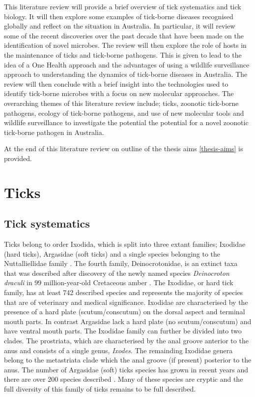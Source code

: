 \documentclass[a4paper, nobind]{templates/ociamthesis}
\begin{document}
This literature review will provide a brief overview of tick systematics and tick biology.
It will then explore some examples of tick-borne diseases recognised globally and reflect on the situation in Australia.
In particular, it will review some of the recent discoveries over the past decade that have been made on the identification of novel microbes.
The review will then explore the role of hosts in the maintenance of ticks and tick-borne pathogens.
This is given to lead to the idea of a One Health approach and the advantages of using a wildlife surveillance approach to understanding the dynamics of tick-borne diseases in Australia.
The review will then conclude with a brief insight into the technologies used to identify tick-borne microbes with a focus on new molecular approaches.
The overarching themes of this literature review include; ticks, zoonotic tick-borne pathogens, ecology of tick-borne pathogens, and use of new molecular tools and wildlife surveillance to investigate the potential the potential for a novel zoonotic tick-borne pathogen in Australia.

At the end of this literature review on outline of the thesis aims \ref{thesis-aims} is provided.

\hypertarget{ticks}{%
\section{Ticks}\label{ticks}}

\hypertarget{tick-systematics}{%
\subsection{Tick systematics}\label{tick-systematics}}

Ticks belong to order Ixodida, which is split into three extant families; Ixodidae (hard ticks), Argasidae (soft ticks) and a single species belonging to the Nuttalliellidae family \autocite{durdenModernTickSystematics2014}.
The fourth family, Deinocrotonidae, is an extinct taxa that was described after discovery of the newly named species \emph{Deinocroton draculi} in 99 million-year-old Cretaceous amber \autocite{penalverTicksParasitisedFeathered2017}.
The Ixodidae, or hard tick family, has at least 742 described species \autocite{guglielmoneIxodidaeAcariIxodoidea2020} and represents the majority of species that are of veterinary and medical significance.
Ixodidae are characterised by the presence of a hard plate (scutum/conscutum) on the dorsal aspect and terminal mouth parts.
In contrast Argasidae lack a hard plate (no scutum/conscutum) and have ventral mouth parts.
The Ixodidae family can further be divided into two clades.
The prostriata, which are characterised by the anal groove anterior to the anus and consists of a single genus, \emph{Ixodes}.
The remainding Ixodidae genera belong to the metastriata clade which the anal groove (if present) posterior to the anus.
The number of Argasidae (soft) ticks species has grown in recent years and there are over 200 species described \autocite{mansArgasidIxodidSystematics2019}.
Many of these species are cryptic and the full diversity of this family of ticks remains to be full described.
\end{document}
